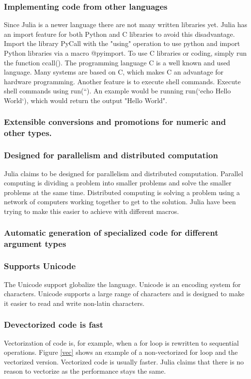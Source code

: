 \documentclass[a4paper, 11pt, titlepage]{article}
\begin{document}
\subsubsection{Implementing code from other languages}
Since Julia is a newer language there are not many written libraries yet. Julia has an import feature for both Python and C libraries to avoid this disadvantage. Import the library PyCall with the "using" operation to use python and import Python libraries via a macro @pyimport. To use C libraries or coding, simply run the function ccall(). The programming language C is a well known and used language. Many systems are based on C, which makes C an advantage for hardware programming. Another feature is to execute shell commands. Execute shell commands using run(``). An example would be running run(`echo Hello World`), which would return the output "Hello World".

\subsubsection{Extensible conversions and promotions for numeric and other types.}


\subsubsection{Designed for parallelism and distributed computation}
Julia claims to be designed for parallelism and distributed computation. Parallel computing is dividing a problem into smaller problems and solve the smaller problems at the same time. Distributed computing is solving a problem using a network of computers working together to get to the solution. Julia have been trying to make this easier to achieve with different macros.

\subsubsection{Automatic generation of specialized code for different argument types}

\subsubsection{Supports Unicode}
The Unicode support globalize the language. Unicode is an encoding system for characters. Unicode supports a large range of characters and is designed to make it easier to read and write non-latin characters.

\subsubsection{Devectorized code is fast}
Vectorization of code is, for example, when a for loop is rewritten to sequential operations. Figure \ref{vec} shows an example of a non-vectorized for loop and the vectorized version. Vectorized code is usually faster. Julia claims that there is no reason to vectorize as the performance stays the same.
\end{document}
